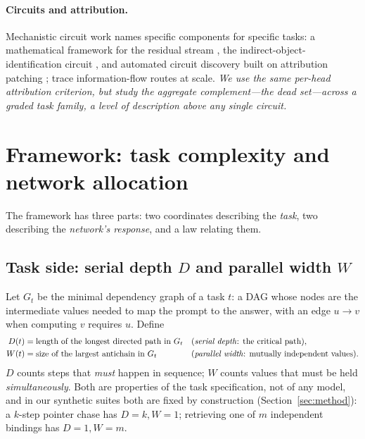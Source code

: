 \documentclass[11pt]{article}
\begin{document}
\paragraph{Circuits and attribution.}
Mechanistic circuit work names specific components for specific tasks: a
mathematical framework for the residual stream \citep{elhage2021mathematical},
the indirect-object-identification circuit \citep{wang2022interpretability},
and automated circuit discovery \citep{conmy2023towards} built on attribution
patching \citep{nanda2023attribution}; \citet{ferrando2024information} trace
information-flow routes at scale. \emph{We use the same per-head attribution
criterion, but study the aggregate complement---the dead set---across a graded
task family, a level of description above any single circuit.}

\section{Framework: task complexity and network allocation}\label{sec:framework}
The framework has three parts: two coordinates describing the \emph{task}, two
describing the \emph{network's response}, and a law relating them.

\subsection{Task side: serial depth $D$ and parallel width $W$}
Let $G_t$ be the minimal dependency graph of a task $t$: a DAG whose nodes are
the intermediate values needed to map the prompt to the answer, with an edge
$u\!\to\!v$ when computing $v$ requires $u$. Define
\begin{align}
D(t) &= \text{length of the longest directed path in } G_t
        &&\text{(\emph{serial depth}: the critical path)},\\
W(t) &= \text{size of the largest antichain in } G_t
        &&\text{(\emph{parallel width}: mutually independent values)} .
\end{align}
$D$ counts steps that \emph{must} happen in sequence; $W$ counts values that
must be held \emph{simultaneously}. Both are properties of the task
specification, not of any model, and in our synthetic suites both are fixed by
construction (Section~\ref{sec:method}): a $k$-step pointer chase has
$D{=}k,W{=}1$; retrieving one of $m$ independent bindings has $D{=}1,W{=}m$.
\end{document}
